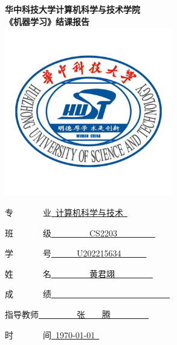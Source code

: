 \begin{titlepage}

\begin{center}


 

{\huge \bfseries 华中科技大学计算机科学与技术学院}\\[1.5cm]

{ \huge \bfseries 《机器学习》结课报告}\\[1.5cm]

\includegraphics[width=0.55\textwidth]{figure/logo1.png}\\[1.5cm]   






\begin{minipage}{0.5\textwidth}
\large
{\heiti 专~~~~~~~业}\quad \underline{~计算机科学与技术~} 

{\heiti 班~~~~~~~级}\quad \underline{~~~~~~~~~CS2203~~~~~~~~~}

{\heiti 学~~~~~~~号}\quad \underline{~~~~~~U202215634~~~~~~}

{\heiti 姓~~~~~~~名}\quad \underline{~~~~~~~~~黄君翊~~~~~~~~~}

{\heiti 成~~~~~~~绩}\quad \underline{~~~~~~~~~~~~~~~~~~~~~~~~~~~~}

{\heiti 指导教师}\quad \underline{~~~~~~~~~张~~~~腾~~~~~~~~~}

{\heiti 时~~~~~~~间}\quad \underline{~\today~}
\end{minipage}

\vfill

\end{center}

\end{titlepage}
